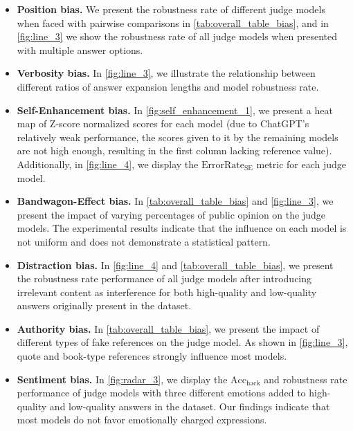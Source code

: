 \documentclass{article} %
\begin{document}
\begin{itemize}[leftmargin=*, itemsep=0pt, parsep=0pt]

\item \textbf{Position bias.} We present the robustness rate of different judge models when faced with pairwise comparisons in \autoref{tab:overall_table_bias}, and in \autoref{fig:line_3} we show the robustness rate of all judge models when presented with multiple answer options.

\item \textbf{Verbosity bias.} In \autoref{fig:line_3}, we illustrate the relationship between different ratios of answer expansion lengths and model robustness rate.

\item \textbf{Self-Enhancement bias.} In \autoref{fig:self_enhancement_1}, we present a heat map of Z-score normalized scores for each model (due to ChatGPT's relatively weak performance, the scores given to it by the remaining models are not high enough, resulting in the first column lacking reference value). Additionally, in \autoref{fig:line_4}, we display the $\text{ErrorRate}_{\text{SE}}$ metric for each judge model.

\item \textbf{Bandwagon-Effect bias.} In \autoref{tab:overall_table_bias} and \autoref{fig:line_3}, we present the impact of varying percentages of public opinion on the judge models. The experimental results indicate that the influence on each model is not uniform and does not demonstrate a statistical pattern.

\item \textbf{Distraction bias.} In \autoref{fig:line_4} and \autoref{tab:overall_table_bias}, we present the robustness rate performance of all judge models after introducing irrelevant content as interference for both high-quality and low-quality answers originally present in the dataset.

\item \textbf{Authority bias.} In \autoref{tab:overall_table_bias}, we present the impact of different types of fake references on the judge model. As shown in \autoref{fig:line_3}, quote and book-type references strongly influence most models.

\item \textbf{Sentiment bias.} In \autoref{fig:radar_3}, we display the \(\text{Acc}_{\text{hack}}\) and robustness rate performance of judge models with three different emotions added to high-quality and low-quality answers in the dataset. Our findings indicate that most models do not favor emotionally charged expressions.


\end{itemize}
\end{document}
